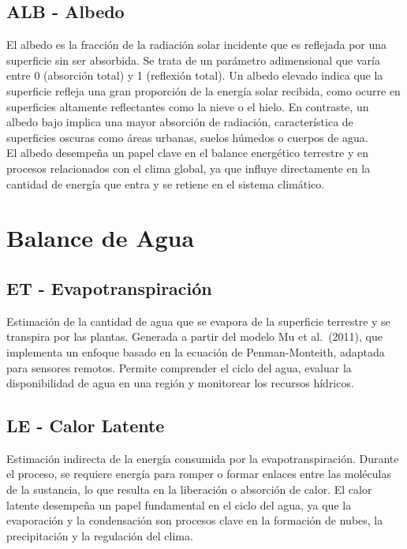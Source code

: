 \documentclass[
]{book}
\begin{document}
\subsection{\texorpdfstring{\textbf{ALB} - Albedo}{ALB - Albedo}}\label{alb---albedo}

El albedo es la fracción de la radiación solar incidente que es reflejada por una superficie sin ser absorbida. Se trata de un parámetro adimensional que varía entre 0 (absorción total) y 1 (reflexión total). Un albedo elevado indica que la superficie refleja una gran proporción de la energía solar recibida, como ocurre en superficies altamente reflectantes como la nieve o el hielo. En contraste, un albedo bajo implica una mayor absorción de radiación, característica de superficies oscuras como áreas urbanas, suelos húmedos o cuerpos de agua.\\
El albedo desempeña un papel clave en el balance energético terrestre y en procesos relacionados con el clima global, ya que influye directamente en la cantidad de energía que entra y se retiene en el sistema climático.

\section{\texorpdfstring{\textbf{Balance de Agua}}{Balance de Agua}}\label{balance-de-agua}

\subsection{\texorpdfstring{\textbf{ET} - Evapotranspiración}{ET - Evapotranspiración}}\label{et---evapotranspiraciuxf3n}

Estimación de la cantidad de agua que se evapora de la superficie terrestre y se transpira por las plantas. Generada a partir del modelo Mu et al.~(2011), que implementa un enfoque basado en la ecuación de Penman-Monteith, adaptada para sensores remotos. Permite comprender el ciclo del agua, evaluar la disponibilidad de agua en una región y monitorear los recursos hídricos.

\subsection{\texorpdfstring{\textbf{LE} - Calor Latente}{LE - Calor Latente}}\label{le---calor-latente}

Estimación indirecta de la energía consumida por la evapotranspiración. Durante el proceso, se requiere energía para romper o formar enlaces entre las moléculas de la sustancia, lo que resulta en la liberación o absorción de calor. El calor latente desempeña un papel fundamental en el ciclo del agua, ya que la evaporación y la condensación son procesos clave en la formación de nubes, la precipitación y la regulación del clima.
\end{document}
